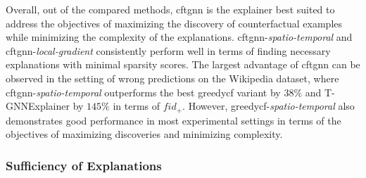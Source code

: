 Overall, out of the compared methods, \gls{cftgnn} is the explainer best suited to address the objectives of maximizing the discovery of counterfactual examples while minimizing the complexity of the explanations. \gls{cftgnn}-\textit{spatio-temporal} and \gls{cftgnn}-\textit{local-gradient} consistently perform well in terms of finding necessary explanations with minimal sparsity scores. The largest advantage of \gls{cftgnn} can be observed in the setting of wrong predictions on the Wikipedia dataset, where \gls{cftgnn}-\textit{spatio-temporal} outperforms the best \gls{greedycf} variant by $38\%$ and T-GNNExplainer by $145\%$ in terms of $fid_+$. However, \gls{greedycf}-\textit{spatio-temporal} also demonstrates good performance in most experimental settings in terms of the objectives of maximizing discoveries and minimizing complexity.


\FloatBarrier

\subsubsection{Sufficiency of Explanations}
\label{s_Evaluation_Results_Sufficiency}

